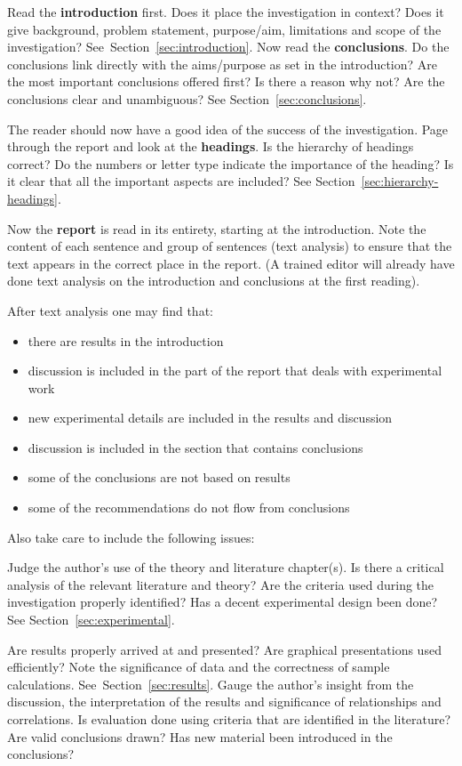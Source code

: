 \documentclass[a5paper, 10pt]{article}
\newcommand{\strongemph}[1]{\textbf{#1}}
\begin{document}
Read the \strongemph{introduction} first.  Does it place the
investigation in context? Does it give background, problem
statement, purpose/aim, limitations and scope of the investigation?
See~Section~\ref{sec:introduction}.  Now read the
\strongemph{conclusions}.  Do the conclusions link directly with the
aims/purpose as set in the introduction?  Are the most important
conclusions offered first?  Is there a reason why not?  Are the
conclusions clear and unambiguous?  See
Section~\ref{sec:conclusions}.

The reader should now have a good idea of the success of the
investigation.  Page through the report and look at the
\strongemph{headings}.  Is the hierarchy of headings correct?  Do
the numbers or letter type indicate the importance of the heading?  Is
it clear that all the important aspects are included?  See
Section~\ref{sec:hierarchy-headings}.

Now the \strongemph{report} is read in its entirety, starting at the
introduction.  Note the content of each sentence and group of
sentences (text analysis) to ensure that the text appears in the
correct place in the report.  (A trained editor will already have done
text analysis on the introduction and conclusions at the first
reading).

After text analysis one may find that:
\begin{itemize}
\item there are results in the introduction
\item discussion is included in the part of the report that deals with
  experimental work
\item new experimental details are included in the results and discussion
\item discussion is included in the section that contains conclusions
\item some of the conclusions are not based on results
\item some of the recommendations do not flow from conclusions
\end{itemize}

Also take care to include the following issues:

Judge the author's use of the theory and literature chapter(s).  Is
there a critical analysis of the relevant literature and theory?  Are
the criteria used during the investigation properly identified?  Has a
decent experimental design been done?  See
Section~\ref{sec:experimental}.

Are results properly arrived at and presented?  Are graphical
presentations used efficiently?  Note the significance of data and the
correctness of sample calculations.  See~Section~\ref{sec:results}.
Gauge the author's insight from the discussion, the interpretation of
the results and significance of relationships and correlations.  Is
evaluation done using criteria that are identified in the literature?
Are valid conclusions drawn?  Has new material been introduced in the
conclusions?
\end{document}
